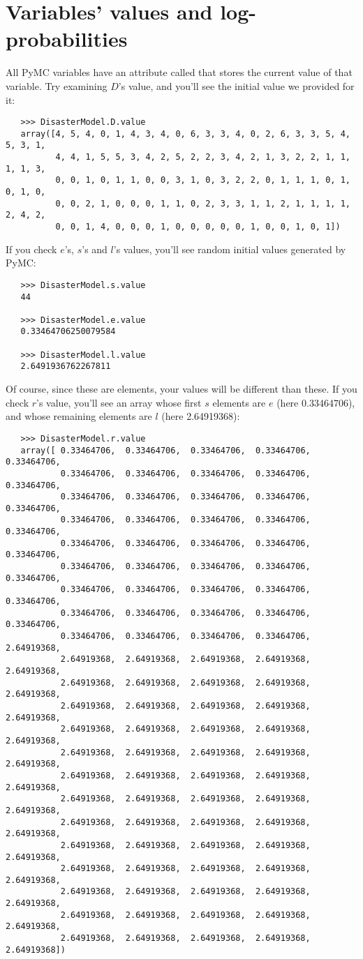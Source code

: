 \section{Variables' values and log-probabilities}
All PyMC variables have an attribute called  that stores the current value of that variable. Try examining $D$'s value, and you'll see the initial value we provided for it:
\begin{verbatim}
   >>> DisasterModel.D.value
   array([4, 5, 4, 0, 1, 4, 3, 4, 0, 6, 3, 3, 4, 0, 2, 6, 3, 3, 5, 4, 5, 3, 1,
          4, 4, 1, 5, 5, 3, 4, 2, 5, 2, 2, 3, 4, 2, 1, 3, 2, 2, 1, 1, 1, 1, 3,
          0, 0, 1, 0, 1, 1, 0, 0, 3, 1, 0, 3, 2, 2, 0, 1, 1, 1, 0, 1, 0, 1, 0,
          0, 0, 2, 1, 0, 0, 0, 1, 1, 0, 2, 3, 3, 1, 1, 2, 1, 1, 1, 1, 2, 4, 2,
          0, 0, 1, 4, 0, 0, 0, 1, 0, 0, 0, 0, 0, 1, 0, 0, 1, 0, 1])
\end{verbatim}
If you check $e$'s, $s$'s and $l$'s values, you'll see random initial values generated by PyMC:
\begin{verbatim}
   >>> DisasterModel.s.value
   44

   >>> DisasterModel.e.value
   0.33464706250079584

   >>> DisasterModel.l.value
   2.6491936762267811
\end{verbatim}
Of course, since these are  elements, your values will be different than these. If you check $r$'s value, you'll see an array whose first $s$ elements are $e$ (here 0.33464706), and whose remaining elements are $l$ (here 2.64919368):
\begin{verbatim}
   >>> DisasterModel.r.value
   array([ 0.33464706,  0.33464706,  0.33464706,  0.33464706,  0.33464706,
           0.33464706,  0.33464706,  0.33464706,  0.33464706,  0.33464706,
           0.33464706,  0.33464706,  0.33464706,  0.33464706,  0.33464706,
           0.33464706,  0.33464706,  0.33464706,  0.33464706,  0.33464706,
           0.33464706,  0.33464706,  0.33464706,  0.33464706,  0.33464706,
           0.33464706,  0.33464706,  0.33464706,  0.33464706,  0.33464706,
           0.33464706,  0.33464706,  0.33464706,  0.33464706,  0.33464706,
           0.33464706,  0.33464706,  0.33464706,  0.33464706,  0.33464706,
           0.33464706,  0.33464706,  0.33464706,  0.33464706,  2.64919368,
           2.64919368,  2.64919368,  2.64919368,  2.64919368,  2.64919368,
           2.64919368,  2.64919368,  2.64919368,  2.64919368,  2.64919368,
           2.64919368,  2.64919368,  2.64919368,  2.64919368,  2.64919368,
           2.64919368,  2.64919368,  2.64919368,  2.64919368,  2.64919368,
           2.64919368,  2.64919368,  2.64919368,  2.64919368,  2.64919368,
           2.64919368,  2.64919368,  2.64919368,  2.64919368,  2.64919368,
           2.64919368,  2.64919368,  2.64919368,  2.64919368,  2.64919368,
           2.64919368,  2.64919368,  2.64919368,  2.64919368,  2.64919368,
           2.64919368,  2.64919368,  2.64919368,  2.64919368,  2.64919368,
           2.64919368,  2.64919368,  2.64919368,  2.64919368,  2.64919368,
           2.64919368,  2.64919368,  2.64919368,  2.64919368,  2.64919368,
           2.64919368,  2.64919368,  2.64919368,  2.64919368,  2.64919368,
           2.64919368,  2.64919368,  2.64919368,  2.64919368,  2.64919368])
\end{verbatim}
